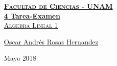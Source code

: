 \documentclass[12pt, fleqn]{article}                             %
\author{Oscar Andrés Rosas}                                     %
\theoremstyle{break}                                            %
\begin{document}
\begin{titlepage}
    
    \pagecolor{TitlePageColor}                                      %
    \color{white}                                                   %

    \vspace                                                         %
    \baselineskip                                                   %

    \makebox[0pt][l]{\rule{1.3\textwidth}{3pt}}                     %
    
    \href{https://compilandoconocimiento.com}                       %
    {\textbf{\textsc{\Huge Facultad de Ciencias - UNAM}}}\\[2.7cm]  %

    \href{\ProjectNameLink/LibroAlgebraLineal}                      %
    {\fontsize{65}{78}\selectfont \textbf{4 Tarea-Examen}\\[0.5cm]  %
    \textcolor{ColorSubtext}{\textsc{\Huge Algebra Lineal 1 }}}     %
    
    \vfill                                                          %
    
    \href{\ProjectAuthorLink}                                       %
    {\LARGE \textsf{Oscar Andrés Rosas Hernandez}}                  %

    \vspace                                                         %
    \baselineskip                                                   %
    
    {\large \textsf{Mayo 2018}}                                     %
 
\end{titlepage}
\end{document}
